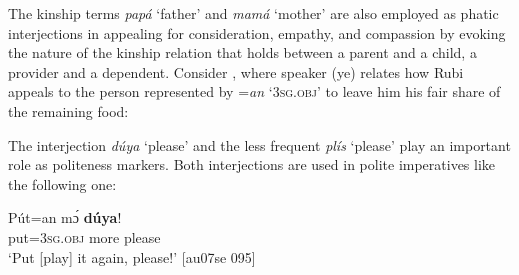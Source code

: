 \ea%
    \label{ex:key:1649}
\z\z

The kinship terms \textit{papá} ‘father’ and \textit{mamá} ‘mother’ are also employed as phatic interjections in appealing for consideration, empathy, and compassion by evoking the nature of the kinship relation that holds between a parent and a child, a provider and a dependent. Consider , where speaker (ye) relates how Rubi appeals to the person represented by =\textit{a}\textit{n} ‘\textsc{3sg.obj}’ to leave him his fair share of the remaining food:


\ea%
    \label{ex:key:1650}
\z\z

The interjection \textit{dúya} ‘please’ and the less frequent \textit{plís} ‘please’ play an important role as politeness markers. Both interjections are used in polite imperatives like the following one: 


\ea%
    \label{ex:key:1651}
    \gll Pút=an    mɔ́    \textbf{dúya}!\\
put=\textsc{3sg.obj}  more  please\\

\glt ‘Put [play] it again, please!’ [au07se 095]
\z

